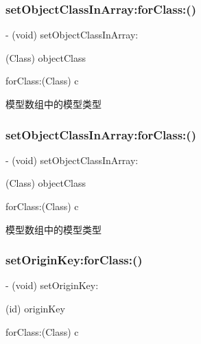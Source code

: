 \subsubsection{\texorpdfstring{set\+Object\+Class\+In\+Array\+:for\+Class\+:()}{setObjectClassInArray:forClass:()}\hspace{0.1cm}{\footnotesize\ttfamily [2/3]}}
{\footnotesize\ttfamily -\/ (void) set\+Object\+Class\+In\+Array\+: \begin{DoxyParamCaption}\item[{(Class)}]{object\+Class }\item[{forClass:(Class)}]{c }\end{DoxyParamCaption}}

模型数组中的模型类型 \mbox{\label{interface_m_j_property_a79178c65fd4d34bdf5199bc7775ae5cd}} 
\subsubsection{\texorpdfstring{set\+Object\+Class\+In\+Array\+:for\+Class\+:()}{setObjectClassInArray:forClass:()}\hspace{0.1cm}{\footnotesize\ttfamily [3/3]}}
{\footnotesize\ttfamily -\/ (void) set\+Object\+Class\+In\+Array\+: \begin{DoxyParamCaption}\item[{(Class)}]{object\+Class }\item[{forClass:(Class)}]{c }\end{DoxyParamCaption}}

模型数组中的模型类型 \mbox{\label{interface_m_j_property_ab05736d1d7501a6c7b686809bcd49a1c}} 
\subsubsection{\texorpdfstring{set\+Origin\+Key\+:for\+Class\+:()}{setOriginKey:forClass:()}\hspace{0.1cm}{\footnotesize\ttfamily [1/3]}}
{\footnotesize\ttfamily -\/ (void) set\+Origin\+Key\+: \begin{DoxyParamCaption}\item[{(id)}]{origin\+Key }\item[{forClass:(Class)}]{c }\end{DoxyParamCaption}}

